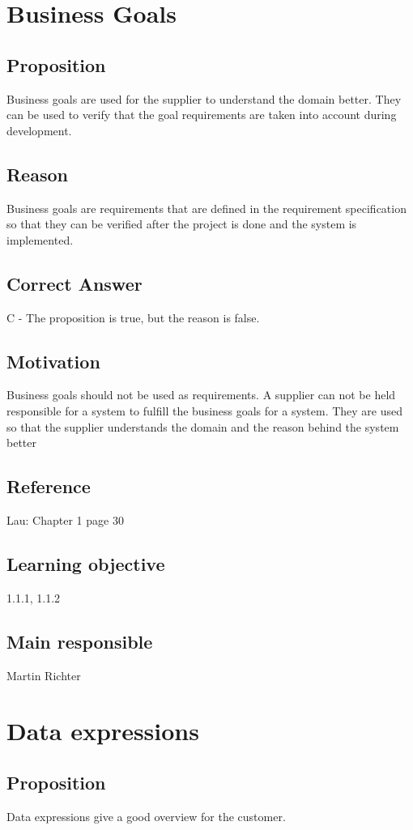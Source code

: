 \documentclass[a4paper]{article}
\begin{document}
\section{Business Goals}
\subsection*{Proposition}
Business goals are used for the supplier to understand the domain better. They can be used to verify that the goal requirements are taken into account during development.
\subsection*{Reason}
Business goals are requirements that are defined in the requirement specification so that they can be verified after the project is done and the system is implemented.
\subsection*{Correct Answer}
C - The proposition is true, but the reason is false.
\subsection*{Motivation}
Business goals should not be used as requirements. A supplier can not be held responsible for a system to fulfill the business goals for a system. They are used so that the supplier understands the domain and the reason behind the system better
\subsection*{Reference}
Lau: Chapter 1 page 30
\subsection*{Learning objective}
1.1.1, 1.1.2
\subsection*{Main responsible}
Martin Richter


\section{Data expressions}
\subsection*{Proposition}
Data expressions give a good overview for the customer.
\end{document}
